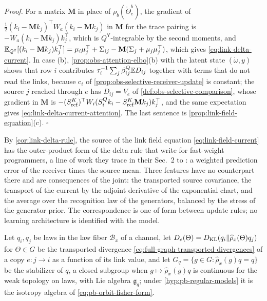 \noindent\emph{Proof.}
For a matrix $\mathbf M$ in place of $\rho_b(\mathring\Theta^b_e)$, the gradient of
$\frac12(k_i-\mathbf Mk_j)^\top W_a(k_i-\mathbf Mk_j)$ in $\mathbf M$ for the trace pairing is
$-W_a(k_i-\mathbf Mk_j)k_j^\top$, which is $Q^{\mathsf Y}$-integrable by the second moments, and
$\mathbb E_{Q^{\mathsf Y}}[(k_i-\mathbf Mk_j)k_j^\top]=\mu_i\mu_j^\top+\Sigma_{ij}-\mathbf M(\Sigma_j+\mu_j\mu_j^\top)$, which
gives \eqref{eq:link-delta-current}. In case (b), \cref{prop:obs-attention-elbo}(b) with the latent state
$(\mathring\omega,y)$ shows that row $i$ contributes $\tau_i^{-1}\sum_j\beta^Q_{ij}\mathbb E D_{ij}$ together with terms
that do not read the links, because $\mathrm c_i$ of \cref{prop:obs-selective-receiver-update} is constant; the
source $j$ reached through $e$ has $D_{ij}=V_e$ of \cref{def:obs-selective-comparison}, whose gradient in
$\mathbf M$ is $-(S^K_{\rm ref})^\top W_i(S^Q_ik_i-S^K_{\rm ref}\mathbf Mk_j)k_j^\top$, and the same expectation gives
\eqref{eq:link-delta-current-attention}. The last sentence is
\cref{prop:link-field-equation}(c). \hfill$\square$

By \cref{cor:link-delta-rule}, the source of the link field equation \eqref{eq:link-field-current} has the
outer-product form of the delta rule that \citet[Sec.~4.2, Eq.~(24)]{Schlag2021} write for fast-weight
programmers, a line of work they trace in their Sec.~2 to \citet{Schmidhuber1992}: a weighted
prediction error of the receiver times the source mean. Three features have no counterpart there and are
consequences of the joint: the transported source covariance, the transport of the current by the
adjoint derivative of the exponential chart, and the average over the recognition law of the generators,
balanced by the stress of the generator prior. The correspondence is one of form between update rules; no
learning architecture is identified with the model.

Let $q_i,q_j$ be laws in the law fiber $\mathcal B_x$ of a channel, let
$D_e(\Theta)=D_{\mathrm{KL}}(q_i\Vert\widehat\rho_x(\Theta)q_j)$ for $\Theta\in G$ be the transported divergence
\eqref{eq:full-graph-transported-divergences} of a copy $e:j\to i$ as a function of its link value, and let
$G_q=\{g\in G:\widehat\rho_x(g)q=q\}$ be the stabilizer of $q$, a closed subgroup when
$g\mapsto\widehat\rho_x(g)q$ is continuous for the weak topology on laws, with Lie algebra $\mathfrak g_q$; under
\cref{hyp:pb-regular-models} it is the isotropy algebra of \eqref{eq:pb-orbit-fisher-form}.

